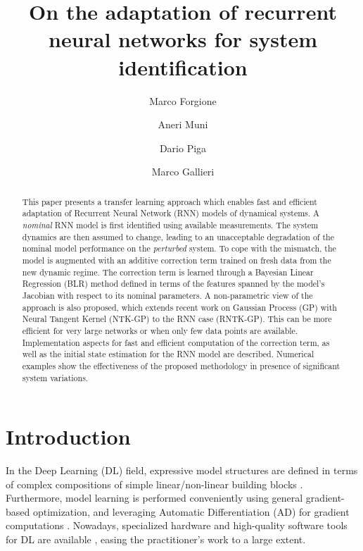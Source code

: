 \documentclass{article}
\title{On the adaptation of recurrent neural networks for system identification}
\author[1]{Marco Forgione}
\author[2]{Aneri Muni}
\author[1]{Dario Piga}
\author[2]{Marco Gallieri}
\affil[1]{Dalle Molle Institute for Artificial Intelligence, IDSIA USI-SUPSI, Via la Santa 1, CH-6962 Lugano-Viganello, Switzerland.}
\affil[2]{NNAISENSE SA, Piazza Molino Nuovo 17, CH-6900 Lugano, Switzerland}
\begin{document}
\maketitle


\begin{abstract}                          %

This paper presents a transfer learning approach which enables fast and efficient adaptation of Recurrent Neural Network (RNN) models of dynamical systems. A \emph{nominal} RNN model is first identified using available measurements. The system dynamics are then assumed to change, leading to an unacceptable degradation of the nominal model performance  on the \emph{perturbed} system. To cope with the  mismatch, the model is augmented  with an additive correction term trained on fresh data from the new dynamic regime. The correction term is learned through a Bayesian Linear Regression (BLR) method defined in terms of the features spanned by the model's Jacobian with respect to its nominal parameters.
A non-parametric view of the approach is also proposed, which extends recent work on Gaussian Process (GP) with Neural Tangent Kernel (NTK-GP) to the RNN case (RNTK-GP). This can be more efficient for very large networks or when only few data points are available. Implementation aspects for fast and efficient computation of the correction term, as well as the initial state estimation for the RNN model are described. Numerical examples show the effectiveness of the proposed methodology in presence of significant system variations. 
\end{abstract}


\section{Introduction}
\label{sec:intro}
In the Deep Learning (DL) field, expressive model structures are defined in terms of 
complex compositions of simple linear/non-linear building blocks \cite{schmidhuber2015deep}. Furthermore, model learning is performed conveniently using general gradient-based optimization, and leveraging  Automatic Differentiation (AD) for gradient computations \cite{baydin2017automatic}. Nowadays, specialized hardware and 
high-quality software tools for DL are available \cite{paszke2017automatic}, easing the practitioner's work to a large extent.
\end{document}

